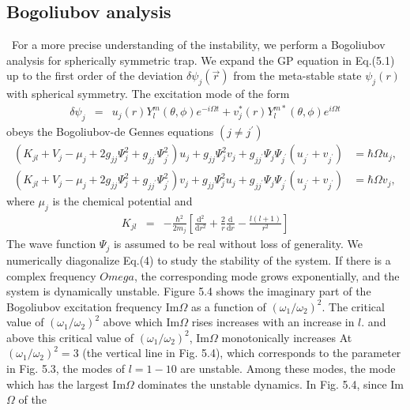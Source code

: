 \documentclass[12pt,a4paper]{report} %
\newcommand{\diff}{\mathrm{d}}				%
\begin{document}
\subsection{Bogoliubov analysis}
\ For a more precise understanding of the instability, we perform a 
Bogoliubov analysis for spherically symmetric trap. We expand the
GP equation in Eq.(5.1) up to the first order of the deviation $\delta \psi_j (\vec{r})$
from the meta-stable state $\psi_j(r)$ with spherical symmetry. The excitation mode of the form
\begin{eqnarray}
\delta \psi_j & = & u_j(r)Y_l^m(\theta, \phi)e^{-i \Omega t} + v_j^* (r)Y_l^{m*}(\theta, \phi)e^{i \Omega t}
\end{eqnarray}
obeys the Bogoliubov-de Gennes equations $(j \neq j^\prime)$
\begin{subequations}
\begin{align}
\left(K_{jl} + V_j - \mu_j + 2g_{jj} \Psi^2_j + g_{jj^\prime} \Psi^2_{j^\prime} \right) u_j
+ g_{jj} \Psi^2_j v_j + g_{jj^\prime} \Psi_j \Psi_{j^\prime} (u_{j^\prime} + v_{j^\prime}) 
& = \hbar \Omega u_j,
\\
\left(K_{jl} + V_j - \mu_j + 2g_{jj} \Psi^2_j + g_{jj^\prime} \Psi^2_{j^\prime} \right) v_j
+ g_{jj} \Psi^2_j u_j + g_{jj^\prime} \Psi_j \Psi_{j^\prime} (u_{j^\prime} + v_{j^\prime}) 
& = \hbar \Omega v_j,
\end{align}
\end{subequations}
where $\mu_j$ is the chemical potential and
\begin{eqnarray}
K_{jl} & = & - \frac{\hbar^2}{2m_j} \left[ \frac{\diff^2}{\diff r^2} + \frac{2}{r} \frac{\diff}{\diff r}
- \frac{l(l+1)}{r^2} \right]
\end{eqnarray}
The wave function $\Psi_j$ is assumed to be real without loss of 
generality. We numerically diagonalize Eq.(4) to study the
stability of the system. If there is a complex frequency $Omega$,
the corresponding mode grows exponentially, and the system
is dynamically unstable. Figure 5.4 shows the imaginary part
of the Bogoliubov excitation frequency Im$\Omega$ as a function
of $(\omega_1 / \omega_2)^2$. The critical value of $(\omega_1 / \omega_2)^2$ above which
Im$\Omega$ rises increases with an increase in $l$. and above this
critical value of $(\omega_1 / \omega_2)^2$, Im$\Omega$ monotonically increases At
$(\omega_1 / \omega_2)^2 = 3$ (the vertical line in Fig. 5.4), which corresponds
to the parameter in Fig. 5.3, the modes of $l=1-10$ are unstable.
Among these modes, the mode which has the largest Im$\Omega$
dominates the unstable dynamics. In Fig. 5.4, since Im$\Omega$ of the
\end{document}
